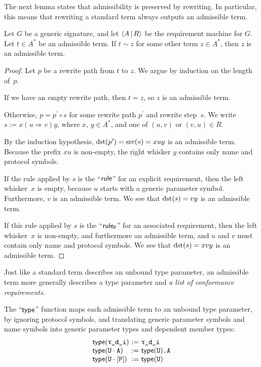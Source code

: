 \documentclass[../generics]{subfiles}
\begin{document}
The next lemma states that admissibility is preserved by rewriting. In particular, this means that rewriting a standard term always outputs an admissible term.
\begin{lemma}\label{rewriting admissible term}
Let $G$ be a generic signature, and let $\langle A\,|\,R\rangle$ be the requirement machine for $G$. Let $t\in A^*$ be an admissible term. If $t\sim z$ for some other term $z\in A^*$, then $z$ is an admissible term.
\end{lemma}
\begin{proof}
Let $p$ be a rewrite path from $t$ to $z$. We argue by induction on the length of~$p$.

\BaseCase If we have an empty rewrite path, then $t=z$, so $z$ is an admissible term.

\InductiveStep Otherwise, $p=p^\prime \circ s$ for some rewrite path $p^\prime$ and rewrite step~$s$. We write $s := x(u\Rightarrow v)y$, where $x$, $y\in A^*$, and one of $(u,v)$ or $(v,u)\in R$.

By the induction hypothesis, $\operatorname{dst}(p^\prime)=\operatorname{src}(s)=xuy$ is an admissible term. Because the prefix $xu$ is non-empty, the right whisker $y$ contains only name and protocol symbols.

If the rule applied by $s$ is the ``$\mathsf{rule}$'' for an explicit requirement, then the left whisker~$x$ is empty, because $u$ starts with a generic parameter symbol. Furthermore, $v$ is an admissible term. We see that $\operatorname{dst}(s)=vy$ is an admissible term.

If this rule applied by $s$ is the ``$\mathsf{rule}_{\texttt{P}}$'' for an associated requirement, then the left whisker~$x$ is non-empty, and furthermore an admissible term, and $u$ and $v$ must contain only name and protocol symbols. We see that $\operatorname{dst}(s)=xvy$ is an admissible term.
\end{proof}

\newcommand{\Chart}{\mathsf{chart}}

Just like a standard term describes an unbound type parameter, an admissible term more generally describes a type parameter and \textsl{a list of conformance requirements}.

\begin{definition}
The ``$\mathsf{type}$'' function maps each admissible term to an unbound type parameter, by ignoring protocol symbols, and translating generic parameter symbols and name symbols into generic parameter types and dependent member types:
\[
\begin{array}{l@{\ :=\ }l}
\Type(\ttgp{d}{i})&\ttgp{d}{i} \\
\Type(\tU \cdot \nA)&\Type(\tU)\texttt{.A} \\ 
\Type(\tU \cdot \pP)&\Type(\tU) 
\end{array}
\]
\end{definition}
\end{document}
